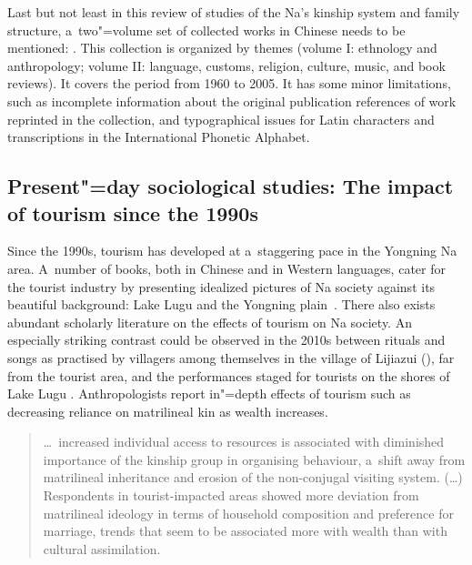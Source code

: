 \largerpage[-2]
Last but not least in this review of studies of the Na's kinship system and family structure, a~two"=volume set of collected works in Chinese needs to be mentioned: \citet{latami2006}. This collection is organized by themes (volume I: ethnology and anthropology; volume II: language, customs, religion, culture, music, and book reviews). It covers the period from 1960 to 2005. It has some minor limitations, such as incomplete information about the original publication references of work reprinted in the collection, and typographical issues for Latin characters and transcriptions in the International Phonetic Alphabet.


\subsection[Present"=day sociological studies]{Present"=day sociological studies: The impact of tourism since the 1990s}
\label{sec:presentdaysociologicalstudiestheimpactoftourismsincethe1990s}

Since the 1990s, tourism has developed at a~staggering pace in the Yongning Na area. A~number of
books, both in Chinese and in Western languages, cater for the tourist industry by presenting
idealized pictures of Na society against its beautiful background: Lake Lugu and the Yongning
plain~\citep[e.g.][]{refflet2006,lamu1998}. There also exists abundant scholarly literature on the effects of tourism on Na society. An especially striking contrast could be observed in the
2010s between rituals and songs as practised by villagers among themselves in the village of
Lijiazui (), far from the tourist area, and the performances staged for tourists on the shores of Lake Lugu \citep{milan2013}. Anthropologists report in"=depth effects of tourism such as decreasing reliance on matrilineal kin as wealth increases.

\begin{quotation}
	{\dots}~increased individual access to resources is associated with	diminished importance of the kinship group in organising behaviour, a~shift away	from matrilineal inheritance and {erosion} of the non-conjugal visiting system. ({\dots}) Respondents in tourist-impacted areas showed more deviation from matrilineal ideology in terms of household composition and preference for marriage, trends that seem to be associated more with wealth than with cultural {assimilation}. \citep[171]{mattison2010}
\end{quotation}

